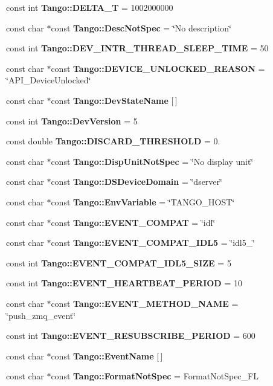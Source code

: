 \begin{DoxyCompactItemize}
\item 
const int {\bf Tango\-::\-D\-E\-L\-T\-A\-\_\-\-T} = 1002000000
\item 
const char $\ast$const {\bf Tango\-::\-Desc\-Not\-Spec} = \char`\"{}No description\char`\"{}
\item 
const int {\bf Tango\-::\-D\-E\-V\-\_\-\-I\-N\-T\-R\-\_\-\-T\-H\-R\-E\-A\-D\-\_\-\-S\-L\-E\-E\-P\-\_\-\-T\-I\-M\-E} = 50
\item 
const char $\ast$const {\bf Tango\-::\-D\-E\-V\-I\-C\-E\-\_\-\-U\-N\-L\-O\-C\-K\-E\-D\-\_\-\-R\-E\-A\-S\-O\-N} = \char`\"{}A\-P\-I\-\_\-\-Device\-Unlocked\char`\"{}
\item 
const char $\ast$const {\bf Tango\-::\-Dev\-State\-Name} [$\,$]
\item 
const int {\bf Tango\-::\-Dev\-Version} = 5
\item 
const double {\bf Tango\-::\-D\-I\-S\-C\-A\-R\-D\-\_\-\-T\-H\-R\-E\-S\-H\-O\-L\-D} = 0.
\item 
const char $\ast$const {\bf Tango\-::\-Disp\-Unit\-Not\-Spec} = \char`\"{}No display unit\char`\"{}
\item 
const char $\ast$const {\bf Tango\-::\-D\-S\-Device\-Domain} = \char`\"{}dserver\char`\"{}
\item 
const char $\ast$const {\bf Tango\-::\-Env\-Variable} = \char`\"{}T\-A\-N\-G\-O\-\_\-\-H\-O\-S\-T\char`\"{}
\item 
const char $\ast$const {\bf Tango\-::\-E\-V\-E\-N\-T\-\_\-\-C\-O\-M\-P\-A\-T} = \char`\"{}idl\char`\"{}
\item 
const char $\ast$const {\bf Tango\-::\-E\-V\-E\-N\-T\-\_\-\-C\-O\-M\-P\-A\-T\-\_\-\-I\-D\-L5} = \char`\"{}idl5\-\_\-\char`\"{}
\item 
const int {\bf Tango\-::\-E\-V\-E\-N\-T\-\_\-\-C\-O\-M\-P\-A\-T\-\_\-\-I\-D\-L5\-\_\-\-S\-I\-Z\-E} = 5
\item 
const int {\bf Tango\-::\-E\-V\-E\-N\-T\-\_\-\-H\-E\-A\-R\-T\-B\-E\-A\-T\-\_\-\-P\-E\-R\-I\-O\-D} = 10
\item 
const char $\ast$const {\bf Tango\-::\-E\-V\-E\-N\-T\-\_\-\-M\-E\-T\-H\-O\-D\-\_\-\-N\-A\-M\-E} = \char`\"{}push\-\_\-zmq\-\_\-event\char`\"{}
\item 
const int {\bf Tango\-::\-E\-V\-E\-N\-T\-\_\-\-R\-E\-S\-U\-B\-S\-C\-R\-I\-B\-E\-\_\-\-P\-E\-R\-I\-O\-D} = 600
\item 
const char $\ast$const {\bf Tango\-::\-Event\-Name} [$\,$]
\item 
const char $\ast$const {\bf Tango\-::\-Format\-Not\-Spec} = Format\-Not\-Spec\-\_\-\-F\-L

\end{DoxyCompactItemize}
